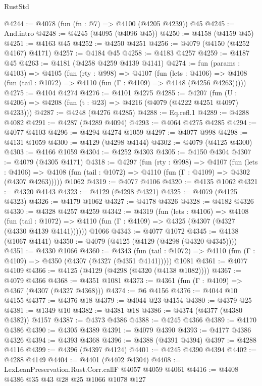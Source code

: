 \begin{lexlean}{RustStd}
\begin{coremodule}
{\begin{coremodule}
{{{{{{{{{{{{{{@4244 := @4078 (fun (fn : @7) => @4100 (@4205 @4239)) @45
@4245 := And.intro
@4248 := @4245 (@4095 (@4096 @45))
@4250 := @4158 (@4159 @45)
@4251 := @4163 @45
@4252 := @4250 @4251
@4256 := @4079 (@4150 (@4252 @4167) @4171)
@4257 := @4184 @45
@4258 := @4183 @4257
@4259 := @4187 @45
@4263 := @4181 (@4258 @4259 @4139 @4141)
@4274 := fun (params : @4103) =>
  @4105
    (fun (rty : @998) =>
    @4107
      (fun (lets : @4106) =>
      @4108 (fun (tail : @1072) => @4110 (fun (Γ : @4109) => @4148 (@4256 @4263)))))
@4275 := @4104 @4274
@4276 := @4101 @4275
@4285 := @4207 (fun (U : @4206) => @4208 (fun (t : @23) => @4216 (@4079 (@4222 @4251 @4097) @4233)))
@4287 := @4248 (@4276 @4285)
@4288 := Eq.refl.{1}
@4289 := @4288 @4082
@4291 := @4287 (@4289 @4094)
@4293 := @4064 @4275 @4285
@4294 := @4077 @4103
@4296 := @4294 @4274 @1059
@4297 := @4077 @998
@4298 := @4131 @1059
@4300 := @4129 (@4298 @4144)
@4302 := @4079 (@4125 @4300)
@4303 := @4166 @1059
@4304 := @4252 @4303
@4305 := @4150 @4304
@4307 := @4079 (@4305 @4171)
@4318 := @4297
    (fun (rty : @998) =>
    @4107
      (fun (lets : @4106) =>
      @4108 (fun (tail : @1072) => @4110 (fun (Γ : @4109) => @4302 (@4307 @4263)))))
    @1062
@4319 := @4077 @4106
@4320 := @4135 @1062
@4321 := @4320 @4143
@4323 := @4129 (@4298 @4321)
@4325 := @4079 (@4125 @4323)
@4326 := @4179 @1062
@4327 := @4178 @4326
@4328 := @4182 @4326
@4330 := @4328 @4257 @4259
@4342 := @4319
    (fun (lets : @4106) =>
    @4108
      (fun (tail : @1072) => @4110 (fun (Γ : @4109) => @4325 (@4307 (@4327 (@4330 @4139 @4141))))))
    @1066
@4343 := @4077 @1072
@4345 := @4138 (@1067 @4141)
@4350 := @4079 (@4125 (@4129 (@4298 (@4320 @4345))))
@4351 := @4330 @1066
@4360 := @4343
    (fun (tail : @1072) => @4110 (fun (Γ : @4109) => @4350 (@4307 (@4327 (@4351 @4141)))))
    @1081
@4361 := @4077 @4109
@4366 := @4125 (@4129 (@4298 (@4320 (@4138 @1082))))
@4367 := @4079 @4366
@4368 := @4351 @1081
@4373 := @4361 (fun (Γ : @4109) => @4367 (@4307 (@4327 @4368)))
@4374 := @6 @4156
@4376 := @4044 @10 @4155
@4377 := @4376 @18
@4379 := @4044 @23 @4154
@4380 := @4379 @25
@4381 := @1349 @10
@4382 := @4381 @18
@4386 := @4374 (@4377 (@4380 @4382)) @4157
@4387 := @4373 @4386
@4388 := @4245 @4366
@4389 := @4170 @4386
@4390 := @4305 @4389
@4391 := @4079 @4390
@4393 := @4177 @4386 @4326
@4394 := @4393 @4368
@4396 := @4388 (@4391 @4394)
@4397 := @4288 @4116
@4399 := @4396 (@4397 @4124)
@4401 := @4245 @4390 @4394
@4402 := @4288 @4149
@4404 := @4401 (@4402 @4304)
@4408 := LexLeanPreservation.Rust.Corr.callF @4057 @4059 @4061
@4416 := @4408 @4386 @35 @43 @28 @25 @1066 @1078 @127
}}}}}}}}}}}}}}
\end{coremodule}}
\end{coremodule}
\end{lexlean}
